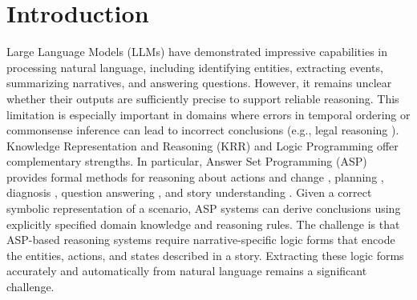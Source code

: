 \documentclass[runningheads]{llncs}
\begin{document}

\section{Introduction}
\label{sec:intro}


Large Language Models (LLMs) have demonstrated impressive capabilities in processing natural language, including identifying entities, extracting events, summarizing narratives, and answering questions. However, it remains unclear whether their outputs are sufficiently precise to support reliable reasoning. This limitation is especially important in domains where errors in temporal ordering or commonsense inference can lead to incorrect conclusions (e.g., legal reasoning \cite{cn25,Zhang_2025}).
Knowledge Representation and Reasoning (KRR) and Logic Programming offer complementary strengths. In particular, Answer Set Programming (ASP) \cite{gl91,mt99,bet11} provides formal methods for reasoning about actions and change \cite{gl93,gk14}, planning \cite{SonPBS23}, diagnosis \cite{bg03a}, question answering \cite{bal08}, and story understanding \cite{LierlerIG17}. Given a correct symbolic representation of a scenario, ASP systems can derive conclusions using explicitly specified domain knowledge and reasoning rules. The challenge is that ASP-based reasoning systems require narrative-specific logic forms that encode the entities, actions, and states described in a story. Extracting these logic forms accurately and automatically from natural language remains a significant challenge.
\end{document}

